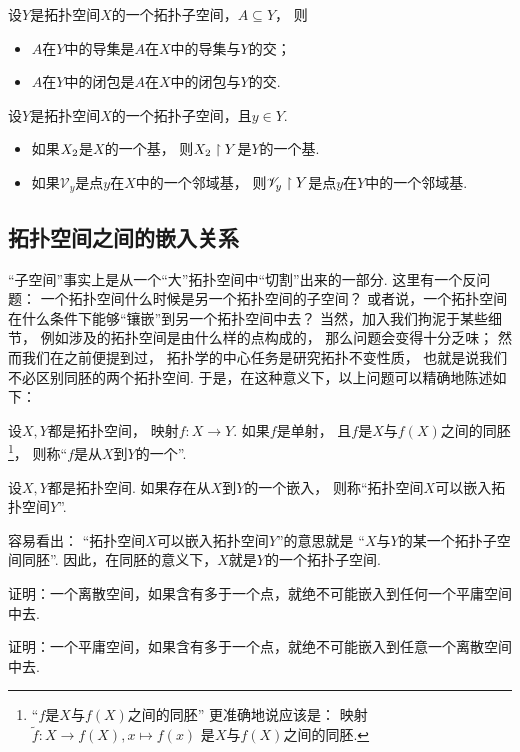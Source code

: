 \begin{theorem}
设\(Y\)是拓扑空间\(X\)的一个拓扑子空间，\(A \subseteq Y\)，
则\begin{itemize}
	\item \(A\)在\(Y\)中的导集是\(A\)在\(X\)中的导集与\(Y\)的交；
	\item \(A\)在\(Y\)中的闭包是\(A\)在\(X\)中的闭包与\(Y\)的交.
\end{itemize}
\end{theorem}

\begin{theorem}
\def\Vy{\mathscr{V}_y}
设\(Y\)是拓扑空间\(X\)的一个拓扑子空间，且\(y \in Y\).
\begin{itemize}
	\item 如果\(X_2\)是\(X\)的一个基，
	则\(X_2 \upharpoonright Y\)是\(Y\)的一个基.
	\item 如果\(\Vy\)是点\(y\)在\(X\)中的一个邻域基，
	则\(\Vy \SetRestrict Y\)是点\(y\)在\(Y\)中的一个邻域基.
\end{itemize}
\end{theorem}

\subsection{拓扑空间之间的嵌入关系}
“子空间”事实上是从一个“大”拓扑空间中“切割”出来的一部分.
这里有一个反问题：
一个拓扑空间什么时候是另一个拓扑空间的子空间？
或者说，一个拓扑空间在什么条件下能够“镶嵌”到另一个拓扑空间中去？
当然，加入我们拘泥于某些细节，
例如涉及的拓扑空间是由什么样的点构成的，
那么问题会变得十分乏味；
然而我们在之前便提到过，
拓扑学的中心任务是研究拓扑不变性质，
也就是说我们不必区别同胚的两个拓扑空间.
于是，在这种意义下，以上问题可以精确地陈述如下：
\begin{definition}
设\(X,Y\)都是拓扑空间，
映射\(f\colon X \to Y\).
如果\(f\)是单射，
且\(f\)是\(X\)与\(f(X)\)之间的同胚\footnote{
	“\(f\)是\(X\)与\(f(X)\)之间的同胚”
	更准确地说应该是：
	映射\(\tilde{f}\colon X \to f(X), x \mapsto f(x)\)
	是\(X\)与\(f(X)\)之间的同胚.
}，
则称“\(f\)是从\(X\)到\(Y\)的一个”.
\end{definition}
\begin{definition}
设\(X,Y\)都是拓扑空间.
如果存在从\(X\)到\(Y\)的一个嵌入，
则称“拓扑空间\(X\)可以嵌入拓扑空间\(Y\)”.
\end{definition}
\begin{remark}
容易看出：
“拓扑空间\(X\)可以嵌入拓扑空间\(Y\)”的意思就是
“\(X\)与\(Y\)的某一个拓扑子空间同胚”.
因此，在同胚的意义下，\(X\)就是\(Y\)的一个拓扑子空间.
\end{remark}

\begin{example}
证明：一个离散空间，如果含有多于一个点，就绝不可能嵌入到任何一个平庸空间中去.
\end{example}

\begin{example}
证明：一个平庸空间，如果含有多于一个点，就绝不可能嵌入到任意一个离散空间中去.
\end{example}
